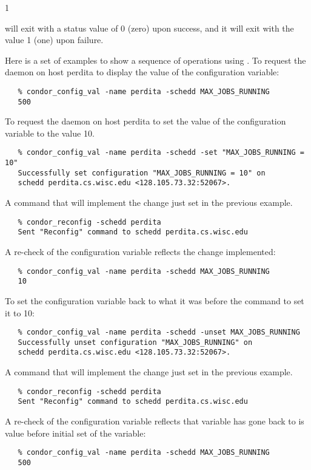 \begin{ManPage}{\label{man-condor-config-val}}{1}
\ExitStatus

 will exit with a status value of 0 (zero) upon success,
and it will exit with the value 1 (one) upon failure.

\Examples

Here is a set of examples to show a sequence of operations using 
.
To request the  daemon on host perdita
to display the value of the  configuration variable:
\footnotesize
\begin{verbatim}
   % condor_config_val -name perdita -schedd MAX_JOBS_RUNNING
   500
\end{verbatim}
\normalsize

To request the  daemon on host perdita
to set the value of the  configuration variable
to the value 10.
\footnotesize
\begin{verbatim}
   % condor_config_val -name perdita -schedd -set "MAX_JOBS_RUNNING = 10"
   Successfully set configuration "MAX_JOBS_RUNNING = 10" on 
   schedd perdita.cs.wisc.edu <128.105.73.32:52067>.
\end{verbatim}
\normalsize

A command that will implement the change just set in the previous
example.
\footnotesize
\begin{verbatim}
   % condor_reconfig -schedd perdita
   Sent "Reconfig" command to schedd perdita.cs.wisc.edu
\end{verbatim}
\normalsize

A re-check of the configuration variable reflects the change implemented:
\footnotesize
\begin{verbatim}
   % condor_config_val -name perdita -schedd MAX_JOBS_RUNNING
   10
\end{verbatim}
\normalsize

To set the configuration variable 
back to what it was before the command to set it to 10:
\footnotesize
\begin{verbatim}
   % condor_config_val -name perdita -schedd -unset MAX_JOBS_RUNNING
   Successfully unset configuration "MAX_JOBS_RUNNING" on 
   schedd perdita.cs.wisc.edu <128.105.73.32:52067>.
\end{verbatim}
\normalsize

A command that will implement the change just set in the previous
example.
\footnotesize
\begin{verbatim}
   % condor_reconfig -schedd perdita
   Sent "Reconfig" command to schedd perdita.cs.wisc.edu
\end{verbatim}
\normalsize

A re-check of the configuration variable reflects that variable
has gone back to is value before initial set of the variable:
\footnotesize
\begin{verbatim}
   % condor_config_val -name perdita -schedd MAX_JOBS_RUNNING
   500
\end{verbatim}
\normalsize

\end{ManPage}
